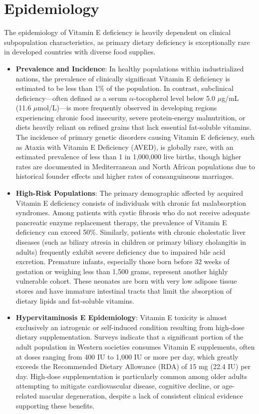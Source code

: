 \section*{Epidemiology}
The epidemiology of Vitamin E deficiency is heavily dependent on clinical subpopulation characteristics, as primary dietary deficiency is exceptionally rare in developed countries with diverse food supplies.

\begin{itemize}
    \item \textbf{Prevalence and Incidence}: In healthy populations within industrialized nations, the prevalence of clinically significant Vitamin E deficiency is estimated to be less than 1\% of the population. In contrast, subclinical deficiency—often defined as a serum $\alpha$-tocopherol level below 5.0 $\mu$g/mL (11.6 $\mu$mol/L)—is more frequently observed in developing regions experiencing chronic food insecurity, severe protein-energy malnutrition, or diets heavily reliant on refined grains that lack essential fat-soluble vitamins. The incidence of primary genetic disorders causing Vitamin E deficiency, such as Ataxia with Vitamin E Deficiency (AVED), is globally rare, with an estimated prevalence of less than 1 in 1,000,000 live births, though higher rates are documented in Mediterranean and North African populations due to historical founder effects and higher rates of consanguineous marriages.
    \item \textbf{High-Risk Populations}: The primary demographic affected by acquired Vitamin E deficiency consists of individuals with chronic fat malabsorption syndromes. Among patients with cystic fibrosis who do not receive adequate pancreatic enzyme replacement therapy, the prevalence of Vitamin E deficiency can exceed 50\%. Similarly, patients with chronic cholestatic liver diseases (such as biliary atresia in children or primary biliary cholangitis in adults) frequently exhibit severe deficiency due to impaired bile acid excretion. Premature infants, especially those born before 32 weeks of gestation or weighing less than 1,500 grams, represent another highly vulnerable cohort. These neonates are born with very low adipose tissue stores and have immature intestinal tracts that limit the absorption of dietary lipids and fat-soluble vitamins.
    \item \textbf{Hypervitaminosis E Epidemiology}: Vitamin E toxicity is almost exclusively an iatrogenic or self-induced condition resulting from high-dose dietary supplementation. Surveys indicate that a significant portion of the adult population in Western societies consumes Vitamin E supplements, often at doses ranging from 400 IU to 1,000 IU or more per day, which greatly exceeds the Recommended Dietary Allowance (RDA) of 15 mg (22.4 IU) per day. High-dose supplementation is particularly common among older adults attempting to mitigate cardiovascular disease, cognitive decline, or age-related macular degeneration, despite a lack of consistent clinical evidence supporting these benefits.
\end{itemize}

